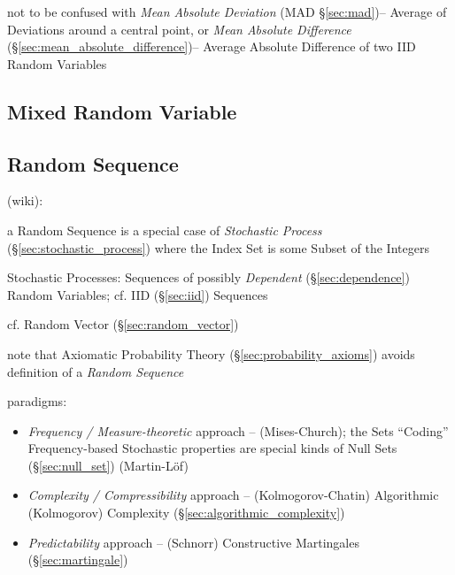 \fist not to be confused with \emph{Mean Absolute Deviation} (MAD
\S\ref{sec:mad})-- Average of Deviations around a central point, or \emph{Mean
  Absolute Difference} (\S\ref{sec:mean_absolute_difference})-- Average Absolute
Difference of two IID Random Variables



\subsection{Mixed Random Variable}\label{sec:mixed_random_variable}

\subsection{Random Sequence}\label{sec:random_sequence}

(wiki):

a Random Sequence is a special case of \emph{Stochastic Process}
(\S\ref{sec:stochastic_process}) where the Index Set is some Subset of the
Integers

Stochastic Processes: Sequences of possibly \emph{Dependent}
(\S\ref{sec:dependence}) Random Variables; cf. IID (\S\ref{sec:iid}) Sequences

cf. Random Vector (\S\ref{sec:random_vector})

note that Axiomatic Probability Theory (\S\ref{sec:probability_axioms})
avoids definition of a \emph{Random Sequence}

paradigms:
\begin{itemize}
  \item \emph{Frequency / Measure-theoretic} approach -- (Mises-Church); the
    Sets ``Coding'' Frequency-based Stochastic properties are special kinds of
    Null Sets (\S\ref{sec:null_set}) (Martin-L\"of)
  \item \emph{Complexity / Compressibility} approach -- (Kolmogorov-Chatin)
    Algorithmic (Kolmogorov) Complexity (\S\ref{sec:algorithmic_complexity})
  \item \emph{Predictability} approach -- (Schnorr) Constructive Martingales
    (\S\ref{sec:martingale})
\end{itemize}

